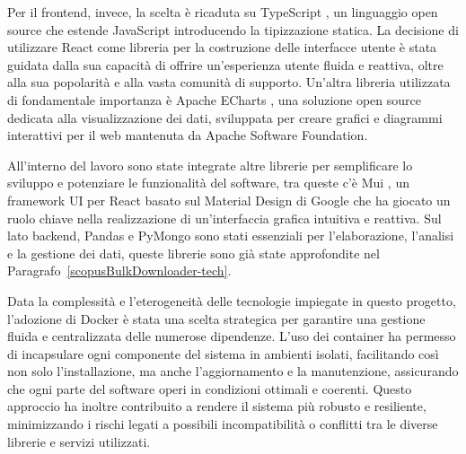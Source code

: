Per il frontend, invece, la scelta è ricaduta su TypeScript \cite{typescript}, un linguaggio open source che estende JavaScript introducendo la tipizzazione statica. La decisione di utilizzare React \cite{react-github} come libreria per la costruzione delle interfacce utente è stata guidata dalla sua capacità di offrire un'esperienza utente fluida e reattiva, oltre alla sua popolarità e alla vasta comunità di supporto. Un'altra libreria utilizzata di fondamentale importanza è Apache ECharts \cite{apache-echarts-github}, una soluzione open source dedicata alla visualizzazione dei dati, sviluppata per creare grafici e diagrammi interattivi per il web mantenuta da Apache Software Foundation.

All'interno del lavoro sono state integrate altre librerie per semplificare lo sviluppo e potenziare le funzionalità del software, tra queste c'è Mui \cite{mui-github}, un framework UI per React basato sul Material Design \cite{material-design} di Google che ha giocato un ruolo chiave nella realizzazione di un'interfaccia grafica intuitiva e reattiva. Sul lato backend, Pandas e PyMongo sono stati essenziali per l'elaborazione, l'analisi e la gestione dei dati, queste librerie sono già state approfondite nel Paragrafo~\ref{scopusBulkDownloader-tech}.

Data la complessità e l'eterogeneità delle tecnologie impiegate in questo progetto, l'adozione di Docker \cite{docker} è stata una scelta strategica per garantire una gestione fluida e centralizzata delle numerose dipendenze. L'uso dei container ha permesso di incapsulare ogni componente del sistema in ambienti isolati, facilitando così non solo l'installazione, ma anche l'aggiornamento e la manutenzione, assicurando che ogni parte del software operi in condizioni ottimali e coerenti. Questo approccio ha inoltre contribuito a rendere il sistema più robusto e resiliente, minimizzando i rischi legati a possibili incompatibilità o conflitti tra le diverse librerie e servizi utilizzati.


